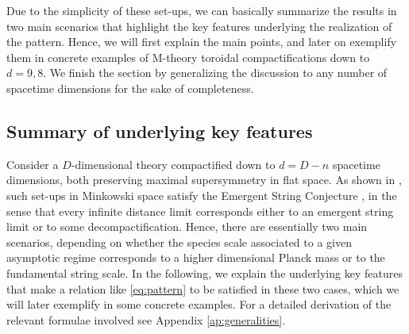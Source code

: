 Due to the simplicity of these set-ups, we can basically summarize the results in two main scenarios that highlight the key features underlying the realization of the pattern. Hence, we will first explain the main points, and later on exemplify them in concrete examples of M-theory toroidal compactifications down to $d=9,8$. We finish the section by generalizing the discussion to any number of spacetime dimensions for the sake of completeness. 
	
\subsection{Summary of underlying key features}
\label{ss:summary}
	
Consider a $D$-dimensional theory compactified down to $d=D-n$ spacetime dimensions, both preserving maximal supersymmetry in flat space. As shown in \cite{Etheredge:2022opl}, such set-ups in Minkowski space satisfy the Emergent String Conjecture \cite{Lee:2019wij}, in the sense that every infinite distance limit corresponds either to an emergent string limit or to some decompactification. Hence, there are essentially two main scenarios, depending on whether the species scale associated to a given asymptotic regime corresponds to a higher dimensional Planck mass or to the fundamental string scale. In the following, we explain the underlying key features that make a relation like \eqref{eq:pattern} to be satisfied in these two cases, which we will later exemplify in some concrete examples. For a detailed derivation of the relevant formulae involved see Appendix \ref{ap:generalities}.

